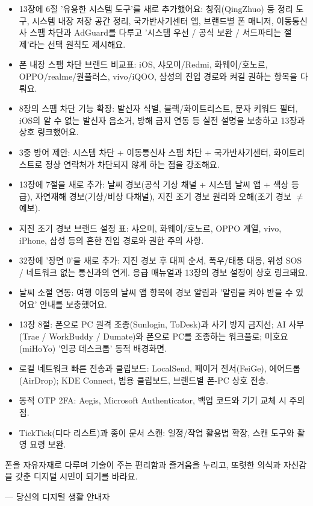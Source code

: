 
\begin{itemize}
  \item 13장에 6절 '유용한 시스템 도구'를 새로 추가했어요: 칭줘(QingZhuo) 등 정리 도구, 시스템 내장 저장 공간 정리, 국가반사기센터 앱, 브랜드별 폰 매니저, 이동통신사 스팸 차단과 AdGuard를 다루고 '시스템 우선 / 공식 보완 / 서드파티는 절제'라는 선택 원칙도 제시해요.
  \item 폰 내장 스팸 차단 브랜드 비교표: iOS, 샤오미/Redmi, 화웨이/호노르, OPPO/realme/원플러스, vivo/iQOO, 삼성의 진입 경로와 켜길 권하는 항목을 다뤄요.
  \item 8장의 스팸 차단 기능 확장: 발신자 식별, 블랙/화이트리스트, 문자 키워드 필터, iOS의 알 수 없는 발신자 음소거, 방해 금지 연동 등 실전 설명을 보충하고 13장과 상호 링크했어요.
  \item 3중 방어 제안: 시스템 차단 + 이동통신사 스팸 차단 + 국가반사기센터, 화이트리스트로 정상 연락처가 차단되지 않게 하는 점을 강조해요.
\end{itemize}


\begin{itemize}
  \item 13장에 7절을 새로 추가: 날씨 경보(공식 기상 채널 + 시스템 날씨 앱 + 색상 등급), 자연재해 경보(기상/비상 다채널), 지진 조기 경보 원리와 오해(조기 경보 $\neq$ 예보).
  \item 지진 조기 경보 브랜드 설정 표: 샤오미, 화웨이/호노르, OPPO 계열, vivo, iPhone, 삼성 등의 흔한 진입 경로와 권한 주의 사항.
  \item 32장에 '장면 0'을 새로 추가: 지진 경보 후 대피 순서, 폭우/태풍 대응, 위성 SOS / 네트워크 없는 통신과의 연계. 응급 매뉴얼과 13장의 경보 설정이 상호 링크돼요.
  \item 날씨 소절 연동: 여행 이동의 날씨 앱 항목에 경보 알림과 '알림을 켜야 받을 수 있어요' 안내를 보충했어요.
\end{itemize}


\begin{itemize}
  \item 13장 8절: 폰으로 PC 원격 조종(Sunlogin, ToDesk)과 사기 방지 금지선; AI 사무(Trae / WorkBuddy / Dumate)와 폰으로 PC를 조종하는 워크플로; 미호요(miHoYo) '인공 데스크톱' 동적 배경화면.
  \item 로컬 네트워크 빠른 전송과 클립보드: LocalSend, 페이거 전서(FeiGe), 에어드롭(AirDrop); KDE Connect, 범용 클립보드, 브랜드별 폰-PC 상호 전송.
  \item 동적 OTP 2FA: Aegis, Microsoft Authenticator, 백업 코드와 기기 교체 시 주의점.
  \item TickTick(디다 리스트)과 종이 문서 스캔: 일정/작업 활용법 확장, 스캔 도구와 촬영 요령 보완.
\end{itemize}

폰을 자유자재로 다루며 기술이 주는 편리함과 즐거움을 누리고, 또렷한 의식과 자신감을 갖춘 디지털 시민이 되기를 바라요.

— 당신의 디지털 생활 안내자
